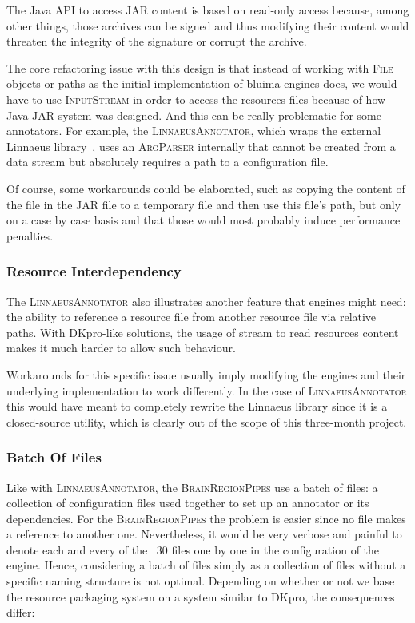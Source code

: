 \documentclass{article}
\newcommand{\ID}[1]{{\textsc{#1}}}
\newcommand{\JAR}{JAR\xspace}
\begin{document}
The Java API to access \JAR content is based on read-only access because, among other things, those
archives can be signed and thus modifying their content would threaten the integrity of the
signature or corrupt the archive.

The core refactoring issue with this design is that instead of working with \ID{File} objects or
paths as the initial implementation of bluima engines does, we would have to use \ID{InputStream} in
order to access the resources files because of how Java \JAR system was designed. And this can be
really problematic for some annotators. For example, the \ID{LinnaeusAnnotator}, which wraps the
external Linnaeus library~\cite{linnaeus}, uses an \ID{ArgParser} internally that cannot be created
from a data stream but absolutely requires a path to a configuration file.

Of course, some workarounds could be elaborated, such as copying the content of the file in the \JAR
file to a temporary file and then use this file's path, but only on a case by case basis and that
those would most probably induce performance penalties.

\subsubsection{Resource Interdependency}

The \ID{LinnaeusAnnotator} also illustrates another feature that engines might need: the ability to
reference a resource file from another resource file via relative paths. With DKpro-like solutions,
the usage of stream to read resources content makes it much harder to allow such behaviour.

Workarounds for this specific issue usually imply modifying the engines and their underlying
implementation to work differently. In the case of \ID{Linnaeus\-Annotator} this would have meant to
completely rewrite the Linnaeus library since it is a closed-source utility, which is clearly out of
the scope of this three-month project.

\subsubsection{Batch Of Files}

Like with \ID{LinnaeusAnnotator}, the \ID{BrainRegionPipes} use a batch of files: a collection of
configuration files used together to set up an annotator or its dependencies. For the
\ID{BrainRegionPipes} the problem is easier since no file makes a reference to another one.
Nevertheless, it would be very verbose and painful to denote each and every of the ~30 files one by
one in the configuration of the engine. Hence, considering a batch of files simply as a collection
of files without a specific naming structure is not optimal. Depending on whether or not we base the
resource packaging system on a system similar to DKpro, the consequences differ:
\end{document}
